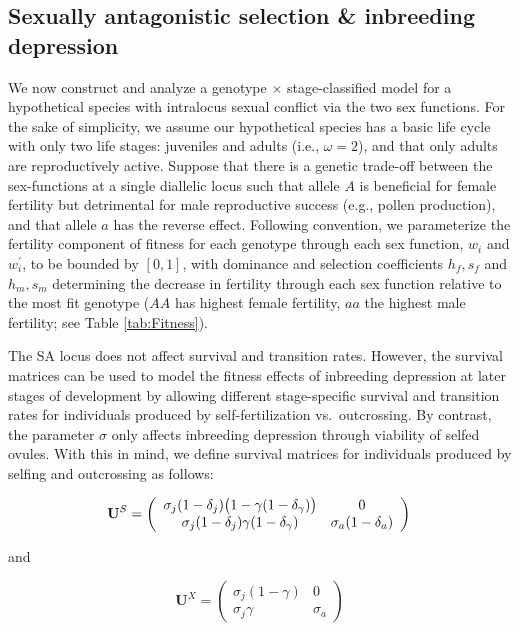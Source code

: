 \documentclass[11pt]{article}
\def\mbf#1{\mathbf{#1}}
\begin{document}
\subsection*{Sexually antagonistic selection \& inbreeding depression} \label{sec:SAsel}

We now construct and analyze a genotype $\times$ stage-classified model for a hypothetical species with intralocus sexual conflict via the two sex functions. For the sake of simplicity, we assume our hypothetical species has a basic life cycle with only two life stages: juveniles and adults (i.e., $\omega = 2$), and that only adults are reproductively active. Suppose that there is a genetic trade-off between the sex-functions at a single diallelic locus such that allele $A$ is beneficial for female fertility but detrimental for male reproductive success (e.g., pollen production), and that allele $a$ has the reverse effect. Following convention, we parameterize the fertility component of fitness for each genotype through each sex function, $w_{i}$ and $w^{\prime}_{i}$, to be bounded by $[0,1]$, with dominance and selection coefficients $h_f, s_f$ and $h_m, s_m$ determining the decrease in fertility through each sex function relative to the most fit genotype ($AA$ has highest female fertility, $aa$ the highest male fertility; see Table \ref{tab:Fitness}). 

The SA locus does not affect survival and transition rates. However, the survival matrices can be used to model the fitness effects of inbreeding depression at later stages of development by allowing different stage-specific survival and transition rates for individuals produced by self-fertilization vs.~outcrossing. By contrast, the parameter $\sigma$ only affects inbreeding depression through viability of selfed ovules. With this in mind, we define survival matrices for individuals produced by selfing and outcrossing as follows:
\begin{linenomath*}
\begin{equation} \label{eq:US}
	\mbf{U}^S = \left(
					\begin{array}{cc}
						\sigma_j (1 - \delta_j) \big(1 - \gamma (1 - \delta_{\gamma}) \big) & 0 \\
						\sigma_j (1 - \delta_j) \gamma (1 - \delta_{\gamma})      & \sigma_a (1 - \delta_a)
					\end{array}
				\right) \\
\end{equation}
\end{linenomath*}
\noindent and 
\begin{linenomath*}
\begin{equation}\label{eq:UX}
	\mbf{U}^X = \left(
					\begin{array}{cc}
						\sigma_j(1 - \gamma) & 0 \\
						\sigma_j \gamma      & \sigma_a
					\end{array}
				\right)
\end{equation}
\end{linenomath*}
\end{document}
